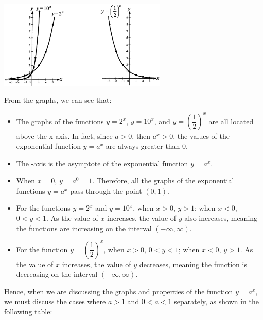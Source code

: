 \documentclass{report}
\begin{document}
    \begin{center}
        \includegraphics[width=0.6\textwidth]{assets/12-1.png}
    \end{center}

    \vspace{-1em}
    From the graphs, we can see that:

    \vspace{-1em}
    \begin{itemize}
        \item The graphs of the functions $y=2^x$, $y=10^x$, and $y=\left(\dfrac{1}{2}\right)^x$ are all located above the x-axis. In fact, since $a > 0$, then $a^x > 0$, the values of the exponential function $y=a^x$ are always greater than 0.
        \item The $ $-axis is the asymptote of the exponential function $y=a^x$.
        \item When $x=0$, $y=a^0=1$. Therefore, all the graphs of the exponential functions $y=a^x$ pass through the point $(0,1)$.
        \item For the functions $y=2^x$ and $y=10^x$, when $x>0$, $y>1$; when $x<0$, $0<y<1$. As the value of $x$ increases, the value of $y$ also increases, meaning the functions are increasing on the interval $(-\infty, \infty)$.
        \item For the function $y=\left(\dfrac{1}{2}\right)^x$, when $x>0$, $0<y<1$; when $x<0$, $y>1$. As the value of $x$ increases, the value of $y$ decreases, meaning the function is decreasing on the interval $(-\infty, \infty)$.
    \end{itemize}

    \vspace{-1em}
    Hence, when we are discussing the graphs and properties of the function $y=a^x$, we must discuss the cases where $a > 1$ and $0 < a < 1$ separately, as shown in the following table:
\end{document}
